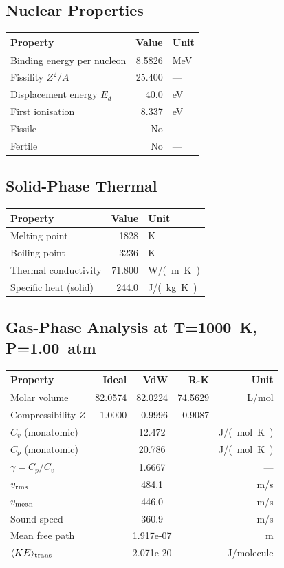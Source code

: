 \documentclass[11pt,a4paper]{article}
\begin{document}
\subsection{Nuclear Properties}
\begin{tabular}{lrl}
  \toprule
  Property & Value & Unit \\
  \midrule
  Binding energy per nucleon & 8.5826 & \si{MeV} \\
  Fissility $Z^2/A$ & 25.400 & --- \\
  Displacement energy $E_d$ & 40.0 & \si{eV} \\
  First ionisation & 8.337 & \si{eV} \\
  Fissile & No & --- \\
  Fertile & No & --- \\
  \bottomrule
\end{tabular}

\subsection{Solid-Phase Thermal}
\begin{tabular}{lrl}
  \toprule
  Property & Value & Unit \\
  \midrule
  Melting point & 1828 & \si{K} \\
  Boiling point & 3236 & \si{K} \\
  Thermal conductivity & 71.800 & \si{W/(m.K)} \\
  Specific heat (solid) & 244.0 & \si{J/(kg.K)} \\
  \bottomrule
\end{tabular}

\subsection{Gas-Phase Analysis at T=\SI{1000}{K}, P=\SI{1.00}{atm}}
\begin{tabular}{lrrrr}
  \toprule
  Property & Ideal & VdW & R-K & Unit \\
  \midrule
  Molar volume & 82.0574 & 82.0224 & 74.5629 & \si{L/mol} \\
  Compressibility $Z$ & 1.0000 & 0.9996 & 0.9087 & --- \\
  \midrule
  $C_v$ (monatomic) & \multicolumn{3}{c}{12.472} & \si{J/(mol.K)} \\
  $C_p$ (monatomic) & \multicolumn{3}{c}{20.786} & \si{J/(mol.K)} \\
  $\gamma = C_p/C_v$ & \multicolumn{3}{c}{1.6667} & --- \\
  $v_{\rm rms}$ & \multicolumn{3}{c}{484.1} & \si{m/s} \\
  $v_{\rm mean}$ & \multicolumn{3}{c}{446.0} & \si{m/s} \\
  Sound speed & \multicolumn{3}{c}{360.9} & \si{m/s} \\
  Mean free path & \multicolumn{3}{c}{1.917e-07} & \si{m} \\
  $\langle KE \rangle_{\rm trans}$ & \multicolumn{3}{c}{2.071e-20} & \si{J/molecule} \\
  \bottomrule
\end{tabular}
\end{document}
